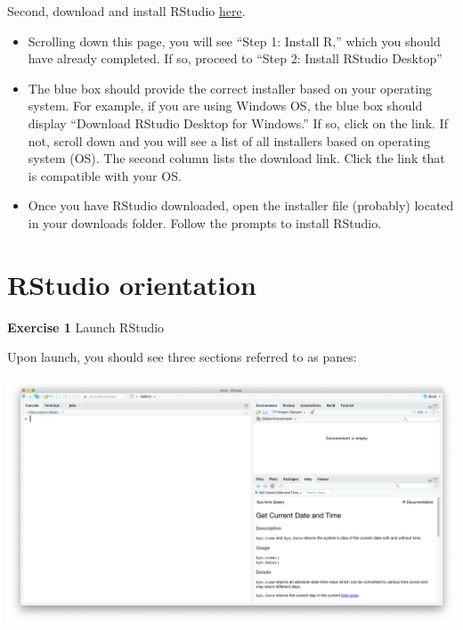 \documentclass[
]{book}
\providecommand{\tightlist}{%
  \setlength{\itemsep}{0pt}\setlength{\parskip}{0pt}}
\newenvironment{rmdblock}[1]
  {\begin{shaded*}
  }
  {\end{shaded*}
  }
\newenvironment{learncheck}
  {\begin{rmdblock}{warning}}
  {\end{rmdblock}}
\begin{document}
Second, download and install RStudio \href{https://www.rstudio.com/products/rstudio/download/}{here}.

\begin{itemize}
\tightlist
\item
  Scrolling down this page, you will see ``Step 1: Install R,'' which you should have already completed. If so, proceed to ``Step 2: Install RStudio Desktop''
\item
  The blue box should provide the correct installer based on your operating system. For example, if you are using Windows OS, the blue box should display ``Download RStudio Desktop for Windows.'' If so, click on the link. If not, scroll down and you will see a list of all installers based on operating system (OS). The second column lists the download link. Click the link that is compatible with your OS.
\item
  Once you have RStudio downloaded, open the installer file (probably) located in your downloads folder. Follow the prompts to install RStudio.
\end{itemize}

\hypertarget{rstudio-orientation}{%
\section{RStudio orientation}\label{rstudio-orientation}}

\begin{learncheck}
\textbf{Exercise 1} Launch RStudio
\end{learncheck}

Upon launch, you should see three sections referred to as panes:

\begin{center}\includegraphics[width=\textwidth]{images/rstudio_sshot} \end{center}
\end{document}

